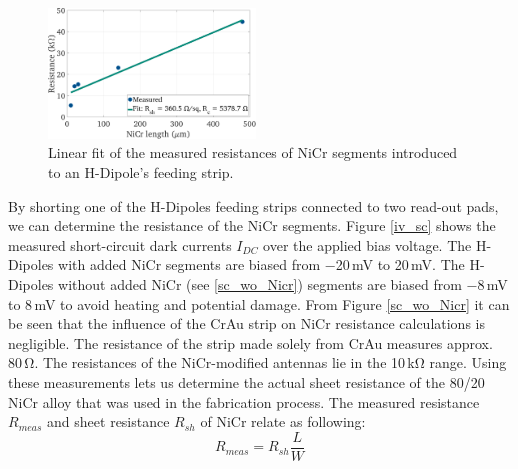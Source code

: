 
\begin{figure} %
    \centering
    \includegraphics[width=0.49\textwidth]{figures/R_sheet_regression.pdf}
    \captionsetup{width=0.475\textwidth} %
    \caption{Linear fit of the measured resistances of NiCr segments introduced to an H-Dipole's feeding strip.}
    \label{fig:Rsheet:reg}
\end{figure}

By shorting one of the H-Dipoles feeding strips connected to two read-out pads, we can determine the resistance of the NiCr segments. Figure \ref{iv_sc} shows the measured short-circuit dark currents $I_{DC}$ over the applied bias voltage. The H-Dipoles with added NiCr segments are biased from \num{-20}\,\si{\milli \volt} to \num{20}\,\si{\milli \volt}. The H-Dipoles without added NiCr (see \ref{sc_wo_Nicr}) segments are biased from \num{-8}\,\si{\milli \volt} to \num{8}\,\si{\milli \volt} to avoid heating and potential damage. From Figure \ref{sc_wo_Nicr} it can be seen that the influence of the CrAu strip on NiCr resistance calculations is negligible. The resistance of the strip made solely from CrAu measures approx. \num{80}\,\si{\ohm}. The resistances of the NiCr-modified antennas lie in the \num{10}\,\si{\kilo \ohm} range. Using these measurements lets us determine the actual sheet resistance of the \num{80}/\num{20} NiCr alloy that was used in the fabrication process. The measured resistance $R_{meas}$ and sheet resistance $R_{sh}$ of NiCr relate as following: 
\begin{equation}
    R_{meas} = R_{sh}\frac{L}{W}
\end{equation}

